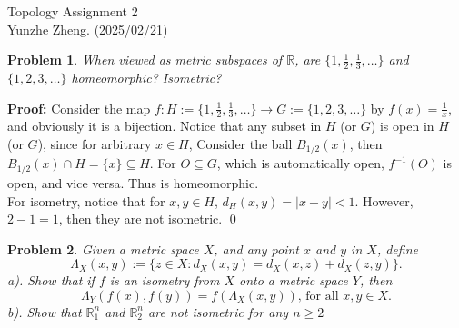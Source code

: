 \documentclass[12pt]{article}
\newtheorem{problem}{Problem}
\begin{document}
\noindent Topology \hfill Assignment 2\\
Yunzhe Zheng. (2025/02/21)

\hrulefill

\begin{problem}
When viewed as metric subspaces of $\mathbb{R}$, are $\{1, \frac{1}{2}, \frac{1}{3}, \dots\}$ and $\{1, 2, 3, \dots\}$ homeomorphic? Isometric?
\end{problem}

\textbf{Proof:} Consider the map $f: H := \{1, \frac{1}{2}, \frac{1}{3}, \dots\}\to G := \{1, 2, 3, \dots\}$ by $f(x) = \frac{1}{x}$, and obviously it is a bijection. Notice that any subset in $H$ (or $G$) is open in $H$ (or $G$), since for arbitrary $x\in H$, Consider the ball $B_{1/2}(x)$, then $B_{1/2}(x)\cap H=\{x\}\subseteq H$. For $O\subseteq G$, which is automatically open, $f^{-1}(O)$ is open, and vice versa. Thus is homeomorphic. \\
\indent For isometry, notice that for $x,y\in H$, $d_{H}(x,y)=|x-y| < 1$. However, $2-1=1$, then they are not isometric. \qed \\

\begin{problem}
Given a metric space $X$, and any point $x$ and $y$ in $X$, define 
$$
\Lambda_{X}(x,y):= \{z\in X: d_{X}(x,y)=d_{X}(x, z) + d_{X}(z,y)\}.
$$
\indent a). Show that if $f$ is an isometry from $X$ onto a metric space $Y$, then 
$$
\Lambda_{Y}(f(x), f(y))=f(\Lambda_{X}(x,y)) \text{, for all } x,y\in X.
$$ 
\indent b). Show that $\mathbb{R}_{1}^{n}$ and $\mathbb{R}^{n}_{2}$ are not isometric for any $n\geq 2$
\end{problem}
\end{document}
